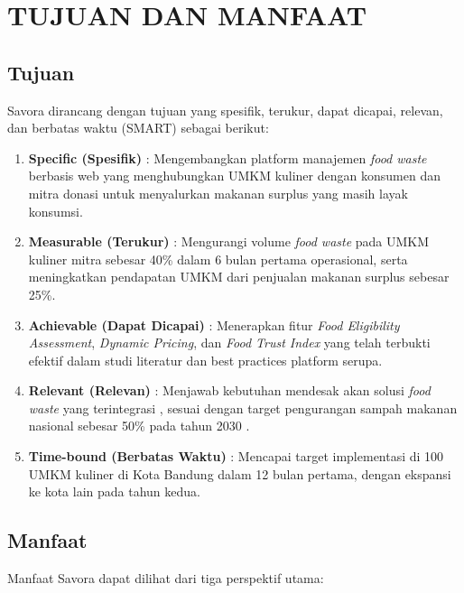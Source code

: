 \section{TUJUAN DAN MANFAAT}

\subsection{Tujuan}

Savora dirancang dengan tujuan yang spesifik, terukur, dapat dicapai, relevan, dan berbatas waktu (SMART) sebagai berikut:

\begin{enumerate}[leftmargin=*]
    \item \textbf{Specific (Spesifik)} : Mengembangkan platform manajemen \textit{food waste} berbasis web yang menghubungkan UMKM kuliner dengan konsumen dan mitra donasi untuk menyalurkan makanan surplus yang masih layak konsumsi.
    
    \item \textbf{Measurable (Terukur)} : Mengurangi volume \textit{food waste} pada UMKM kuliner mitra sebesar 40\% dalam 6 bulan pertama operasional, serta meningkatkan pendapatan UMKM dari penjualan makanan surplus sebesar 25\%.
    
    \item \textbf{Achievable (Dapat Dicapai)} : Menerapkan fitur \textit{Food Eligibility Assessment}, \textit{Dynamic Pricing}, dan \textit{Food Trust Index} yang telah terbukti efektif dalam studi literatur \cite{kusumawati2025mobile}\cite{qlearning2026pricing} dan best practices platform serupa.
    
    \item \textbf{Relevant (Relevan)} : Menjawab kebutuhan mendesak akan solusi \textit{food waste} yang terintegrasi \cite{mobilefoodwaste2024review}, sesuai dengan target pengurangan sampah makanan nasional sebesar 50\% pada tahun 2030 \cite{unsdg2024}.
    
    \item \textbf{Time-bound (Berbatas Waktu)} : Mencapai target implementasi di 100 UMKM kuliner di Kota Bandung dalam 12 bulan pertama, dengan ekspansi ke kota lain pada tahun kedua.
\end{enumerate}

\subsection{Manfaat}

Manfaat Savora dapat dilihat dari tiga perspektif utama:

